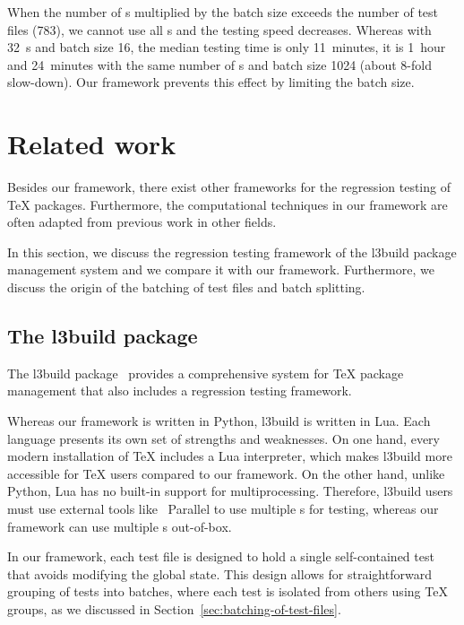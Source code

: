 \documentclass[final]{ltugboat}
\begin{document}
When the number of s multiplied by the batch size exceeds the number of test files (783), we cannot use all s and the testing speed decreases. Whereas with 32~s and batch size 16, the median testing time is only 11~minutes, it is 1~hour and 24~minutes with the same number of s and batch size 1024 (about 8-fold slow-down). Our framework prevents this effect by limiting the batch size.

\section{Related work}
\label{sec:related-work}

Besides our framework, there exist other frameworks for the regression testing of \TeX{} packages. Furthermore, the computational techniques in our framework are often adapted from previous work in other fields.

In this section, we discuss the regression testing framework of the l3build package management system and we compare it with our framework. Furthermore, we discuss the origin of the batching of test files and batch splitting.

\subsection{The l3build package}
The l3build package~\cite{mittelbach2014l3build, wright2015automating, wright2022l3build, latex2023l3build} provides a comprehensive system for \TeX{} package management that also includes a regression testing framework.

Whereas our framework is written in Python, l3build is written in Lua. Each language presents its own set of strengths and weaknesses. On one hand, every modern installation of \TeX{} includes a Lua interpreter, which makes l3build more accessible for \TeX{} users compared to our framework. On the other hand, unlike Python, Lua has no built-in support for multiprocessing. Therefore, l3build users must use external tools like ~Parallel to use multiple s for testing, whereas our framework can use multiple s out-of-box.

In our framework, each test file is designed to hold a single self-contained test that avoids modifying the global state. This design allows for straightforward grouping of tests into batches, where each test is isolated from others using \TeX{} groups, as we discussed in Section~\ref{sec:batching-of-test-files}.
\end{document}
